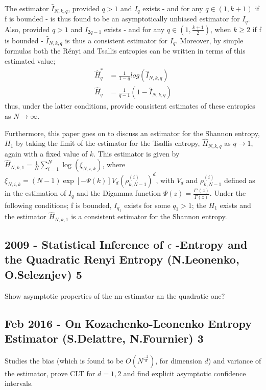 \documentclass{article}
\begin{document}
The estimator $\hat{I}_{N, k, q}$, provided $q>1$ and $I_{q}$ exists - and for any $q \in (1, k+1)$ if f is bounded - is thus found to be an asymptotically unbiased estimator for $I_{q}$. Also, provided  $q>1$ and $I_{2q-1}$ exists -  and for any $q \in (1, \frac{k+1}{2})$, when $k \geq 2$ if f is bounded - $\hat{I}_{N, k, q}$ is thus a consistent estimator for $I_{q}$. Moreover, by simple formulas both the R\'enyi and Tsallis entropies can be written in terms of this estimated value; 
\begin{align}
\hat{H}_{q}^{*} &= \frac{1}{1-q} log(\hat{I}_{N, k, q}) \\
\hat{H}_{q} &= \frac{1}{q-1} (1 - \hat{I}_{N, k, q})
\end{align}
thus, under the latter conditions, provide consistent estimates of these entropies as $N \to \infty$.

Furthermore, this paper goes on to discuss an estimator for the Shannon entropy, $H_{1}$ by taking the limit of the estimator for the Tsallis entropy, $\hat{H}_{N, k, q}$ as $q \to 1$, again with a fixed value of $k$. This estimator is given by $\hat{H}_{N, k, 1} =  \frac{1}{N} \sum_{i=1}^{N} \log (\xi_{N, i, k})$, where $\xi_{N, i, k} = (N-1)\exp[-\Psi(k)]V_{d}(\rho_{k, N-1}^{(i)})^{d}$, with $V_{d}$ and $\rho_{k, N-1}^{(i)}$ defined as in the estimation of $I_{q}$ and the Digamma function $\Psi(z) = \frac{\Gamma'(z)}{\Gamma(z)}$. Under the following conditions; f is bounded, $I_{q_{1}}$ exists for some $q_{1} > 1$; the $H_{1}$ exists and the estimator $\hat{H}_{N, k, 1}$ is a consistent estimator for the Shannon entropy.




\subsection{2009 - Statistical Inference of $\epsilon$ -Entropy and the Quadratic Renyi Entropy (N.Leonenko, O.Seleznjev) 5}

Show asymptotic properties of the nn-estimator an the quadratic one?

\subsection{Feb 2016 - On Kozachenko-Leonenko Entropy Estimator (S.Delattre, N.Fournier) 3}

Studies the bias (which is found to be $O(N^{\frac{-2}{d}})$, for dimension $d$) and variance of the estimator, prove CLT for $d=1,2$ and find explicit asymptotic confidence intervals.
\end{document}

